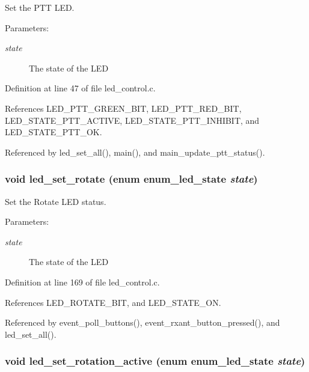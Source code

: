 Set the PTT LED. 

\begin{Desc}
\item[Parameters:]
\begin{description}
\item[{\em state}]The state of the LED \end{description}
\end{Desc}


Definition at line 47 of file led\_\-control.c.

References LED\_\-PTT\_\-GREEN\_\-BIT, LED\_\-PTT\_\-RED\_\-BIT, LED\_\-STATE\_\-PTT\_\-ACTIVE, LED\_\-STATE\_\-PTT\_\-INHIBIT, and LED\_\-STATE\_\-PTT\_\-OK.

Referenced by led\_\-set\_\-all(), main(), and main\_\-update\_\-ptt\_\-status().
\subsubsection[{led\_\-set\_\-rotate}]{\setlength{\rightskip}{0pt plus 5cm}void led\_\-set\_\-rotate (enum {\bf enum\_\-led\_\-state} {\em state})}\label{led__control_8h_c7b0014c475fe68f1db5ef137c71bb84}


Set the Rotate LED status. 

\begin{Desc}
\item[Parameters:]
\begin{description}
\item[{\em state}]The state of the LED \end{description}
\end{Desc}


Definition at line 169 of file led\_\-control.c.

References LED\_\-ROTATE\_\-BIT, and LED\_\-STATE\_\-ON.

Referenced by event\_\-poll\_\-buttons(), event\_\-rxant\_\-button\_\-pressed(), and led\_\-set\_\-all().
\subsubsection[{led\_\-set\_\-rotation\_\-active}]{\setlength{\rightskip}{0pt plus 5cm}void led\_\-set\_\-rotation\_\-active (enum {\bf enum\_\-led\_\-state} {\em state})}\label{led__control_8h_67a6ae6da6bd1e1000cb0cfae12ebf53}


